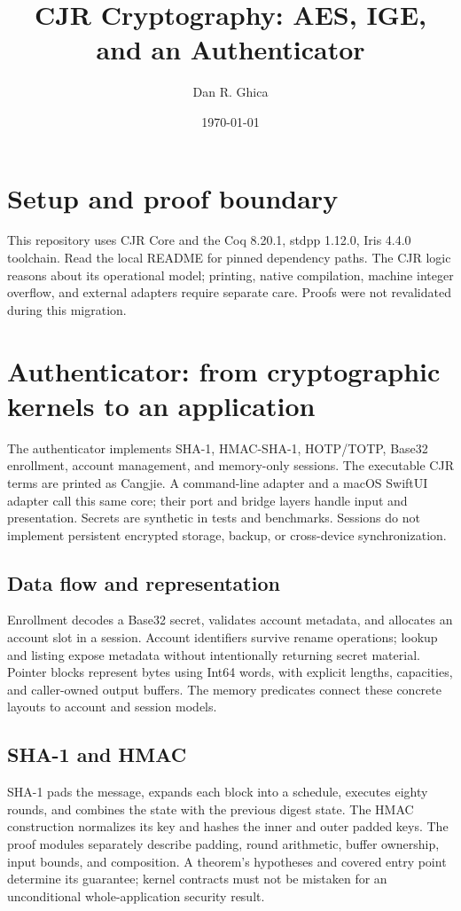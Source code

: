 \documentclass[11pt]{article}
\title{CJR Cryptography: AES, IGE, and an Authenticator}
\author{Dan R. Ghica}
\date{\today}
\begin{document}
\maketitle
\tableofcontents
\clearpage
\section{Setup and proof boundary}
This repository uses CJR Core and the Coq 8.20.1, stdpp 1.12.0, Iris 4.4.0 toolchain. Read the local README for pinned dependency paths. The CJR logic reasons about its operational model; printing, native compilation, machine integer overflow, and external adapters require separate care. Proofs were not revalidated during this migration.


\section{Authenticator: from cryptographic kernels to an application}
The authenticator implements SHA-1, HMAC-SHA-1, HOTP/TOTP, Base32 enrollment,
account management, and memory-only sessions. The executable CJR terms are
printed as Cangjie. A command-line adapter and a macOS SwiftUI adapter call
this same core; their port and bridge layers handle input and presentation.
Secrets are synthetic in tests and benchmarks. Sessions do not implement
persistent encrypted storage, backup, or cross-device synchronization.
\subsection{Data flow and representation}
Enrollment decodes a Base32 secret, validates account metadata, and allocates
an account slot in a session. Account identifiers survive rename operations;
lookup and listing expose metadata without intentionally returning secret
material. Pointer blocks represent bytes using Int64 words, with explicit
lengths, capacities, and caller-owned output buffers. The memory predicates
connect these concrete layouts to account and session models.
\subsection{SHA-1 and HMAC}
SHA-1 pads the message, expands each block into a schedule, executes eighty
rounds, and combines the state with the previous digest state. The HMAC
construction normalizes its key and hashes the inner and outer padded keys.
The proof modules separately describe padding, round arithmetic, buffer
ownership, input bounds, and composition. A theorem's hypotheses and covered
entry point determine its guarantee; kernel contracts must not be mistaken
for an unconditional whole-application security result.
\end{document}
